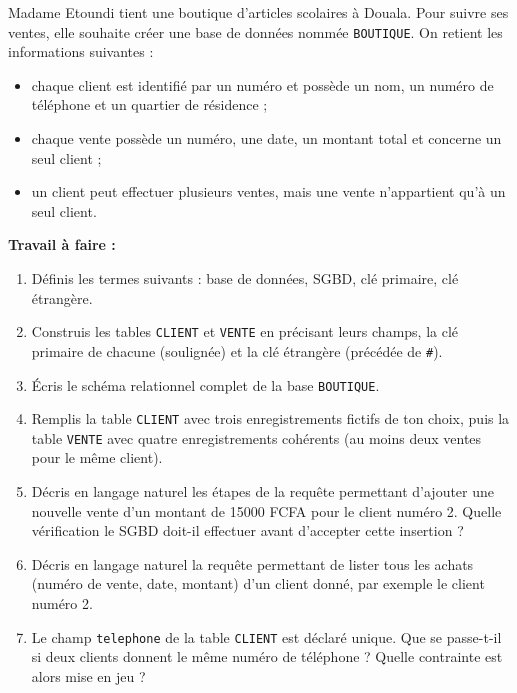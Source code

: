 \documentclass[11pt]{article}
\begin{document}
\begin{exercice}
Madame Etoundi tient une boutique d'articles scolaires à Douala. Pour suivre ses ventes, elle souhaite créer une base de données nommée \texttt{BOUTIQUE}. On retient les informations suivantes :
\begin{itemize}
\item chaque client est identifié par un numéro et possède un nom, un numéro de téléphone et un quartier de résidence ;
\item chaque vente possède un numéro, une date, un montant total et concerne un seul client ;
\item un client peut effectuer plusieurs ventes, mais une vente n'appartient qu'à un seul client.
\end{itemize}

\textbf{Travail à faire :}
\begin{enumerate}
\item Définis les termes suivants : base de données, SGBD, clé primaire, clé étrangère.
\item Construis les tables \texttt{CLIENT} et \texttt{VENTE} en précisant leurs champs, la clé primaire de chacune (soulignée) et la clé étrangère (précédée de \texttt{\#}).
\item Écris le schéma relationnel complet de la base \texttt{BOUTIQUE}.
\item Remplis la table \texttt{CLIENT} avec trois enregistrements fictifs de ton choix, puis la table \texttt{VENTE} avec quatre enregistrements cohérents (au moins deux ventes pour le même client).
\item Décris en langage naturel les étapes de la requête permettant d'ajouter une nouvelle vente d'un montant de \num{15000} FCFA pour le client numéro 2. Quelle vérification le SGBD doit-il effectuer avant d'accepter cette insertion ?
\item Décris en langage naturel la requête permettant de lister tous les achats (numéro de vente, date, montant) d'un client donné, par exemple le client numéro 2.
\item Le champ \texttt{telephone} de la table \texttt{CLIENT} est déclaré unique. Que se passe-t-il si deux clients donnent le même numéro de téléphone ? Quelle contrainte est alors mise en jeu ?
\end{enumerate}
\end{exercice}
\end{document}
